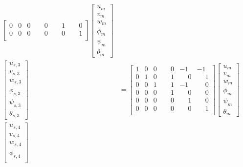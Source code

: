 \documentclass[10pt,b5paper,titlepage]{book}
\newenvironment{eqarray}
{
    \begin{eqnarray}
        \begin{aligned}
}
{
        \end{aligned}
    \end{eqnarray}
}
\begin{document}
\begin{eqarray}
\begin{bmatrix}
        0 & 0 & 0 & \phantom{-}0 & \phantom{-}1 & \phantom{-}0 \\
        0 & 0 & 0 & \phantom{-}0 & \phantom{-}0 & \phantom{-}1 \\
    \end{bmatrix}
    \begin{bmatrix}
        u_m \\
        v_m \\
        w_m \\
        \phi_m \\
        \psi_m \\
        \theta_m
    \end{bmatrix} \\
    \begin{bmatrix}
        u_{s,3} \\
        v_{s,3} \\
        w_{s,3} \\
        \phi_{s,3} \\
        \psi_{s,3} \\
        \theta_{s,3}
    \end{bmatrix}
    &= \begin{bmatrix}
        1 & 0 & 0 & \phantom{-}0 & -1 & -1 \\
        0 & 1 & 0 & \phantom{-}1 & \phantom{-}0 & \phantom{-}1 \\
        0 & 0 & 1 & \phantom{-}1 & -1 & \phantom{-}0 \\
        0 & 0 & 0 & \phantom{-}1 & \phantom{-}0 & \phantom{-}0 \\
        0 & 0 & 0 & \phantom{-}0 & \phantom{-}1 & \phantom{-}0 \\
        0 & 0 & 0 & \phantom{-}0 & \phantom{-}0 & \phantom{-}1 \\
    \end{bmatrix}
    \begin{bmatrix}
        u_m \\
        v_m \\
        w_m \\
        \phi_m \\
        \psi_m \\
        \theta_m
    \end{bmatrix} \\
    \begin{bmatrix}
        u_{s,4} \\
        v_{s,4} \\
        w_{s,4} \\
        \phi_{s,4} \\

\end{bmatrix}
\end{eqarray}
\end{document}
